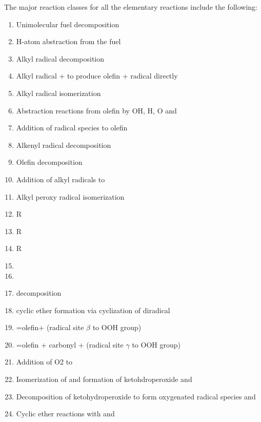 


The major reaction classes for all the elementary reactions include the following:
\begin{enumerate}
    \item Unimolecular fuel decomposition
    \item H-atom abstraction from the fuel
    \item Alkyl radical decomposition
    \item Alkyl radical +  to produce olefin +  radical directly
    \item Alkyl radical isomerization
    \item Abstraction reactions from olefin by OH, H, O and 
    \item Addition of radical species to olefin 
    \item Alkenyl radical decomposition
    \item Olefin decomposition 
    \item Addition of alkyl radicals to  
    \item Alkyl peroxy radical isomerization 
    \item R
    \item R
    \item R
    \item {}
    \item {}
    \item {} decomposition
    \item {} cyclic ether formation via cyclization of diradical
    \item {}=olefin+ (radical site $\beta$ to OOH group)
    \item {}=olefin + carbonyl +  (radical site $\gamma$ to OOH group)
    \item Addition of O2 to 
    \item Isomerization of  and formation of ketohdroperoxide and 
    \item Decomposition of ketohydroperoxide to form oxygenated radical species and 
    \item Cyclic ether reactions with  and 
\end{enumerate}
 
